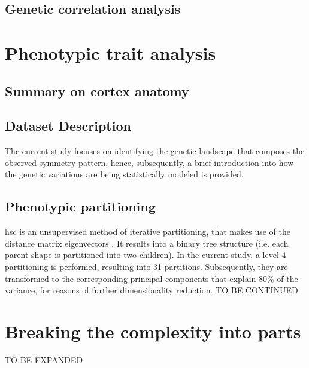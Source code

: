 \subsection{Genetic correlation analysis}


\section{Phenotypic trait analysis}\label{sec:phenotype_intro}
\subsection{Summary on cortex anatomy}
 
\subsection{Dataset Description}
 

The current study focuses on identifying the genetic landscape that composes the observed symmetry pattern, hence, subsequently, a brief introduction into how the genetic variations are being statistically modeled is provided.




\citet{Sha2021}


\subsection{Phenotypic partitioning}\label{sec:hsc}
\Acf{hsc} is an unsupervised method of iterative partitioning, that makes use of the distance matrix eigenvectors \cite{Ng2002}. It results into a binary tree structure (i.e. each parent shape is partitioned into two children). In the current study, a level-4 partitioning is performed, resulting into 31 partitions. Subsequently, they are transformed to the corresponding principal components that explain 80\% of the variance, for reasons of further dimensionality reduction. TO BE CONTINUED




\section{Breaking the complexity into parts}
TO BE EXPANDED

